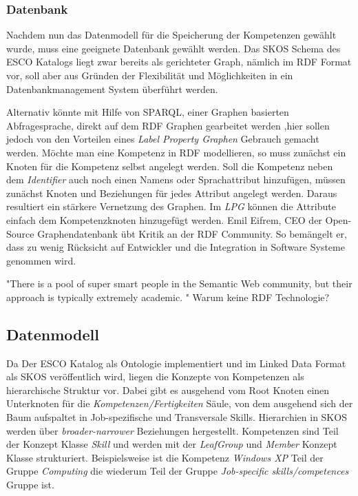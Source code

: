 \subsubsection{Datenbank}

Nachdem nun das Datenmodell für die Speicherung der Kompetenzen gewählt wurde, muss eine geeignete Datenbank gewählt werden. Das SKOS Schema des ESCO Katalogs liegt zwar bereits als gerichteter Graph, nämlich im RDF Format vor, soll aber aus Gründen der Flexibilität und Möglichkeiten in ein Datenbankmanagement System überführt werden.

Alternativ könnte mit Hilfe von SPARQL, einer Graphen basierten Abfragesprache, direkt auf dem RDF Graphen gearbeitet werden 
,hier sollen jedoch von den Vorteilen eines \textit{Label Property Graphen}  Gebrauch gemacht werden. Möchte man eine Kompetenz in RDF modellieren, so muss zunächst ein Knoten für die Kompetenz selbst angelegt werden. Soll die Kompetenz neben dem \textit{Identifier} auch noch einen Namens oder Sprachattribut hinzufügen, müssen zunächst Knoten und Beziehungen für jedes Attribut angelegt werden. Daraus resultiert ein stärkere Vernetzung des Graphen. Im \textit{LPG} können die Attribute einfach dem Kompetenzknoten hinzugefügt werden. Emil Eifrem, CEO der Open-Source Graphendatenbank \cite{Neo4j} übt Kritik an der RDF Community. So bemängelt er, dass zu wenig Rücksicht auf Entwickler und die Integration in Software Systeme genommen wird. \cite{anadiotis_2017} 

"There is a pool of super smart people in the Semantic Web community, but their approach is typically extremely academic. "
Warum keine RDF Technologie?

\subsection{Datenmodell}

Da Der ESCO Katalog als Ontologie implementiert und im Linked Data Format als SKOS veröffentlich wird, liegen die Konzepte von Kompetenzen als hierarchische Struktur vor. Dabei gibt es ausgehend vom Root Knoten einen Unterknoten für die \textit{Kompetenzen/Fertigkeiten} Säule, von dem ausgehend sich der Baum aufspaltet in Job-spezifische und Transversale Skills. Hierarchien in SKOS werden über \textit{broader-narrower} Beziehungen hergestellt. Kompetenzen sind Teil der Konzept Klasse \textit{Skill} und werden mit der \textit{LeafGroup} und \textit{Member} Konzept Klasse strukturiert. Beispielsweise ist die Kompetenz \textit{Windows XP} Teil der Gruppe \textit{Computing} die wiederum Teil der Gruppe \textit{Job-specific skills/competences} Gruppe ist.

